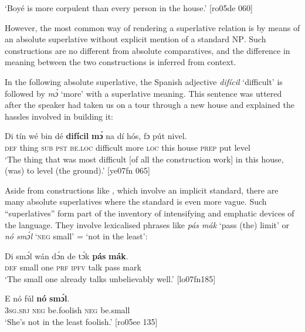 \glt ‘Boyé is more corpulent than every person in the house.’ [ro05de 060]
\z

However, the most common way of rendering a superlative relation is by means of an absolute superlative without explicit mention of a standard \textsc{NP}. Such constructions are no different from absolute comparatives, and the difference in meaning between the two constructions is inferred from context. 


In the following absolute superlative, the Spanish adjective \textit{difícil} ‘difficult’ is followed by \textit{mɔ́} ‘more’ with a superlative meaning. This sentence was uttered after the speaker had taken us on a tour through a new house and explained the hassles involved in building it:



\ea%
    \label{ex:key:490}
    \gll Di  tín    wé  bin  dé    \textbf{difícil}  \textbf{mɔ́}    na  dí  hós,    fɔ  pút  nivel.\\
\textsc{def}  thing  \textsc{sub}  \textsc{pst}  \textsc{be.loc}  difficult  more  \textsc{loc}  this  house  \textsc{prep}  put  level\\

\glt ‘The thing that was most difficult [of all the construction work] in this house, (was) to level (the ground).’ [ye07fn 065]
\z

Aside from constructions like , which involve an implicit standard, there are many absolute superlatives where the standard is even more vague. Such “superlatives” form part of the inventory of intensifying and emphatic devices of the language. They involve lexicalised phrases like \textit{pás mák} ‘pass (the) limit’ or \textit{nó smɔ́l} ‘\textsc{neg} small’ = ‘not in the least’:


\ea%
    \label{ex:key:491}
    \gll Di  smɔ́l  wán  dɔ́n  de  tɔ́k  \textbf{pás}  \textbf{mák}.\\
\textsc{def}  small  one  \textsc{prf}  \textsc{ipfv}  talk  pass  mark\\

\glt ‘The small one already talks unbelievably well.’ [lo07fn185]
\z


\ea%
    \label{ex:key:492}
    \gll E    nó  fúl      \textbf{nó} \textbf{smɔ́l}.\\
\textsc{3sg.sbj}  \textsc{neg}  be.foolish  \textsc{neg}  be.small\\

\glt ‘She’s not in the least foolish.’ [ro05ee 135]
\z

